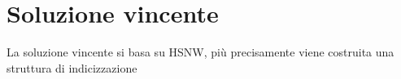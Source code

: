 \chapter{Soluzione vincente}
La soluzione vincente si basa su HSNW, più precisamente viene costruita una 
struttura di indicizzazione 